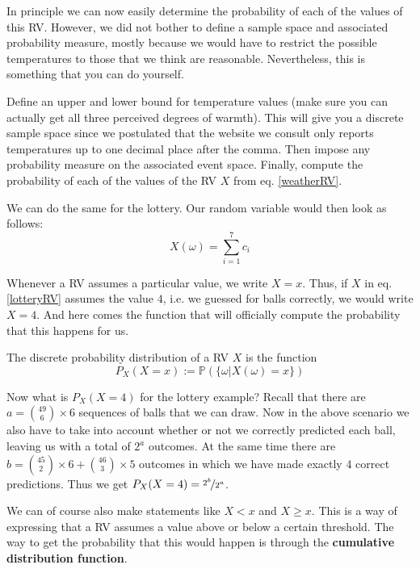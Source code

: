 \documentclass[a4paper,11pt,leqno]{report}
\begin{document}
In principle we can now easily determine the probability of each of the values of this RV. However, we did
not bother to define a sample space and associated probability measure, mostly because we would have to
restrict the possible temperatures to those that we think are reasonable. Nevertheless, this is something
that you can do yourself.

\begin{Exercise}
Define an upper and lower bound for temperature values (make sure you can actually get all three perceived
degrees of warmth). This will give you a discrete sample space since we postulated
that the website we consult only reports temperatures up to one decimal place after the comma. Then impose
any probability measure on the associated event space. Finally, compute the probability of each of the
values of the RV $ X $ from eq. \ref{weatherRV}.
\end{Exercise}

We can do the same for the lottery. Our random variable would then look as follows:
\begin{equation}\label{lotteryRV}
X(\omega) = \overset{7}{\underset{i=1}{\sum}} c_{i}
\end{equation}

Whenever a RV assumes a particular value, we write $ X=x $. Thus, if $ X $ in eq. \ref{lotteryRV} assumes the
value $ 4 $, i.e. we guessed for balls correctly, we would write $ X=4 $. And here comes the function
that will officially compute the probability that this happens for us.

\begin{Definition}
The discrete probability distribution of a RV $ X $ is the function
$$ P_{X}(X=x) := \mathbb{P}(\{\omega|X(\omega)=x\}) $$
\end{Definition}

Now what is $ P_{X}(X=4) $ for the lottery example? Recall that there are 
$ a = \binom{49}{6} \times 6 $ sequences of balls that we can draw. Now in the above scenario we also have to take
into account whether or not we correctly predicted each ball, leaving us with a total of $ 2^{a} $
outcomes. At the same time there are $ b = \binom{45}{2} \times 6 + \binom{46}{3} \times 5 $ outcomes in which we have made 
exactly 4 correct predictions. Thus we get $ P_{X}(X=4) = \nicefrac{2^{b}}{2^{a}} $.

We can of course also make statements
like $ X < x $ and $ X \geq x $. This is a way of expressing that a RV assumes a value above or below a certain
threshold. The way to get the probability that this would happen is through the \textbf{cumulative distribution
function}.
\end{document}
